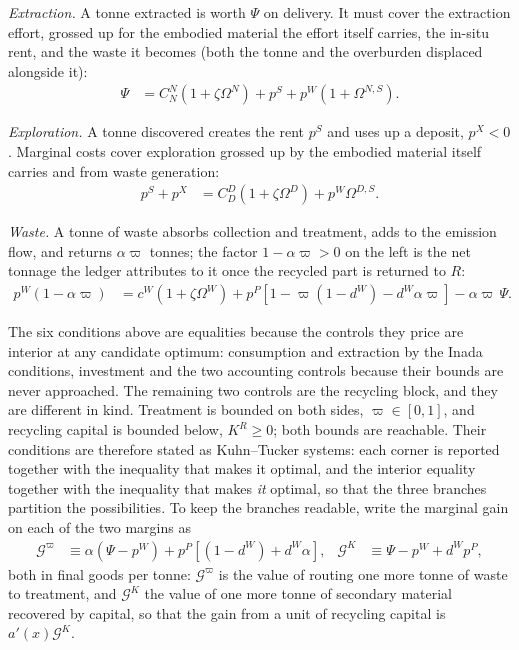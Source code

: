 \emph{Extraction.} A tonne extracted is worth $\Psi$ on delivery. It must cover the extraction effort, grossed up for the embodied material the effort itself carries, the in-situ rent, and the waste it becomes (both the tonne and the overburden displaced alongside it):
\begin{align}
\Psi &= C^N_N\left(1+\zeta\Omega^N\right)+p^S+p^W\left(1+\Omega^{N,S}\right).
\label{eq:sp:sum:N}
\end{align}

\emph{Exploration.} A tonne discovered creates the rent $p^S$ and uses up a deposit, $p^X<0$. Marginal costs cover exploration grossed up by the embodied material itself carries and from waste generation:  
\begin{align}
p^S+p^X &= C^D_D\left(1+\zeta\Omega^D\right)+p^W\Omega^{D,S} .
\label{eq:sp:sum:D}
\end{align}

\emph{Waste.} A tonne of waste absorbs collection and treatment, adds to the emission flow, and returns $\alpha\varpi$ tonnes; the factor $1-\alpha\varpi>0$ on the left is the net tonnage the ledger attributes to it once the recycled part is returned to $R$:
\begin{align}
p^W\left(1-\alpha\varpi\right) &= c^W\left(1+\zeta\Omega^W\right)+p^P\left[1-\varpi\left(1-d^W\right)-d^W\alpha\varpi\right]-\alpha\varpi\,\Psi .
\label{eq:sp:sum:W}
\end{align}

 The six conditions above are equalities because the controls
they price are interior at any candidate optimum: consumption and extraction by the Inada conditions,
investment and the two accounting controls because their bounds are never approached. The remaining
two controls are the recycling block, and they are different in kind. Treatment is bounded on both
sides, $\varpi\in\left[0,1\right]$, and recycling capital is bounded below, $K^R\ge0$; both bounds are
reachable. Their conditions are therefore stated as Kuhn--Tucker systems:
each corner is reported together with the inequality that makes it optimal, and the interior equality
together with the inequality that makes \emph{it} optimal, so that the three branches partition the
possibilities. To keep the branches readable, write the marginal gain on each of the two margins as
\begin{align}
\mathcal G^{\varpi} &\equiv \alpha\left(\Psi-p^W\right)+p^P\left[\left(1-d^W\right)+d^W\alpha\right],
&
\mathcal G^{K} &\equiv \Psi-p^W+d^Wp^P,
\label{eq:sp:sum:gains}
\end{align}
both in final goods per tonne: $\mathcal G^\varpi$ is the value of routing one more tonne of waste to
treatment, and $\mathcal G^{K}$ the value of one more tonne of secondary material recovered by
capital, so that the gain from a unit of recycling capital is $a'\!\left(x\right)\mathcal G^K$.

